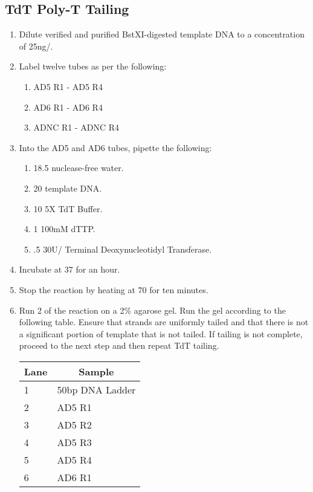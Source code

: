 \documentclass{ssiBio}
\begin{document}
\subsection{TdT Poly-T Tailing}
\begin{enumerate}
  \item{Dilute verified and purified BstXI-digested template DNA to a concentration of 25ng/\uL{}.}
  \item{Label twelve tubes as per the following:}
  \begin{enumerate}
    \item{AD5 R1 - AD5 R4}
    \item{AD6 R1 - AD6 R4}
    \item{ADNC R1 - ADNC R4}
  \end{enumerate}
  \item{Into the AD5 and AD6 tubes, pipette the following:}
  \begin{enumerate}
    \item{18.5\uL{} nuclease-free water.}
    \item{20\uL{} template DNA.}
    \item{10\uL{} 5X TdT Buffer.}
    \item{1\uL{} 100mM dTTP.}
    \item{.5\uL{} 30U/\uL{} Terminal Deoxynucleotidyl Transferase.}
  \end{enumerate}
  \item{Incubate at 37\C{} for an hour.}
  \item{Stop the reaction by heating at 70\C{} for ten minutes.}
  \stopPoint{}
  \item{Run 2\uL{} of the reaction on a 2\% agarose gel. Run the gel according to the following table. Ensure that strands are uniformly tailed and that there is not a significant portion of template that is not tailed. If tailing is not complete, proceed to the next step and then repeat TdT tailing.}
    \begin{table}[ht]
    \centering
    \begin{tabular}{|l|l|}
    \hline
    \multicolumn{1}{|c|}{\textbf{Lane}} & \multicolumn{1}{c|}{\textbf{Sample}} \\ \hline
    1 & 50bp DNA Ladder \\ \hline
    2 & AD5 R1 \\ \hline
    3 & AD5 R2 \\ \hline
    4 & AD5 R3 \\ \hline
    5 & AD5 R4 \\ \hline
    6 & AD6 R1 \\ \hline

\end{tabular}
\end{table}
\end{enumerate}
\end{document}
